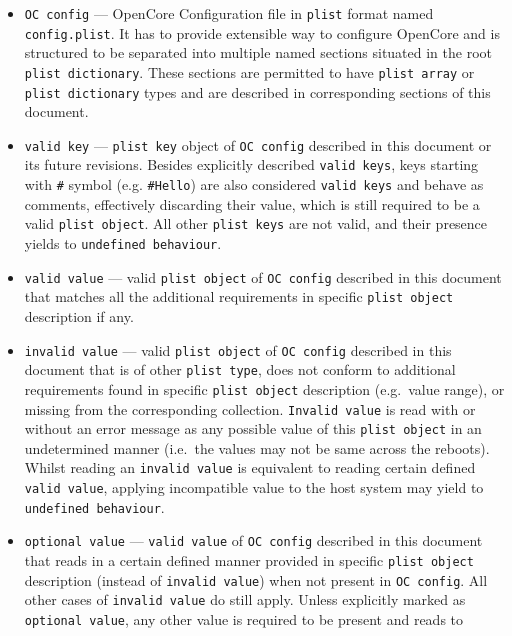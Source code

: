 \documentclass[]{article}
\begin{document}
\begin{itemize}
\item
  \texttt{OC\ config} --- OpenCore Configuration file in \texttt{plist}
  format named \texttt{config.plist}. It has to provide extensible way
  to configure OpenCore and is structured to be separated into multiple
  named sections situated in the root \texttt{plist\ dictionary}. These
  sections are permitted to have \texttt{plist\ array} or
  \texttt{plist\ dictionary} types and are described in corresponding
  sections of this document.
\item
  \texttt{valid\ key} --- \texttt{plist\ key} object of
  \texttt{OC\ config} described in this document or its future
  revisions. Besides explicitly described \texttt{valid\ keys}, keys
  starting with \texttt{\#} symbol (e.g. \texttt{\#Hello}) are also
  considered \texttt{valid\ keys} and behave as comments, effectively
  discarding their value, which is still required to be a valid
  \texttt{plist\ object}. All other \texttt{plist\ keys} are not valid,
  and their presence yields to \texttt{undefined\ behaviour}.
\item
  \texttt{valid\ value} --- valid \texttt{plist\ object} of
  \texttt{OC\ config} described in this document that matches all the
  additional requirements in specific \texttt{plist\ object} description
  if any.
\item
  \texttt{invalid\ value} --- valid \texttt{plist\ object} of
  \texttt{OC\ config} described in this document that is of other
  \texttt{plist\ type}, does not conform to additional requirements
  found in specific \texttt{plist\ object} description (e.g.~value
  range), or missing from the corresponding collection.
  \texttt{Invalid\ value} is read with or without an error message as
  any possible value of this \texttt{plist\ object} in an undetermined
  manner (i.e.~the values may not be same across the reboots). Whilst
  reading an \texttt{invalid\ value} is equivalent to reading certain
  defined \texttt{valid\ value}, applying incompatible value to the host
  system may yield to \texttt{undefined\ behaviour}.
\item
  \texttt{optional\ value} --- \texttt{valid\ value} of
  \texttt{OC\ config} described in this document that reads in a certain
  defined manner provided in specific \texttt{plist\ object} description
  (instead of \texttt{invalid\ value}) when not present in
  \texttt{OC\ config}. All other cases of \texttt{invalid\ value} do
  still apply. Unless explicitly marked as \texttt{optional\ value}, any
  other value is required to be present and reads to

\end{itemize}
\end{document}
